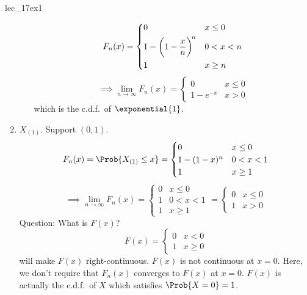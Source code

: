 \begin{Example}{}{lec_17ex1}
\begin{enumerate}[label=(\roman*)]
\begin{itemize}
                        \[ F_n(x)=\begin{dcases}
                                0                                   & x\le 0 \\
                                1-\biggl(1-\frac{x}{n}\biggr)^{\!n} & 0<x<n  \\
                                1                                   & x\ge n
                            \end{dcases} \]
                        \[ \implies
                            \lim\limits_{{n} \to {\infty}} F_n(x)=
                            \begin{cases}
                                0        & x\le 0 \\
                                1-e^{-x} & x>0
                            \end{cases} \]
                        which is the c.d.f.\ of $ \exponential{1} $.
              \end{itemize}
        \item $ X_{(1)} $. Support $ (0,1) $.
              \[ F_n(x)=\Prob{X_{(1)}\le x}=
                  \begin{cases}
                      0         & x\le 0 \\
                      1-(1-x)^n & 0<x<1  \\
                      1         & x\ge 1
                  \end{cases} \]
              \[ \implies \lim\limits_{{n} \to {\infty}} F_n(x)=
                  \begin{cases}
                      0 & x\le 0 \\
                      1 & 0<x<1  \\
                      1 & x\ge 1
                  \end{cases}=
                  \begin{cases}
                      0 & x\le 0 \\
                      1 & x>0
                  \end{cases} \]
              Question: What is $ F(x) $?
              \[ F(x)=\begin{cases}
                      0 & x<0    \\
                      1 & x\ge 0
                  \end{cases} \]
              will make $ F(x) $ right-continuous.
              $ F(x) $ is not continuous at $ x=0 $.
              Here, we don't require that $ F_n(x) $ converges
              to $ F(x) $ at $ x=0 $. $ F(x) $
              is actually the c.d.f.\ of $ X $
              which satisfies $ \Prob{X=0}=1 $.


\end{enumerate}
\end{Example}
